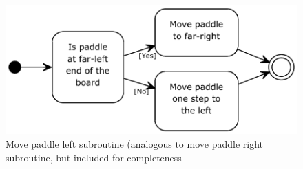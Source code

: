 \begin{figure}
\includegraphics[width = \textwidth]{description-and-methodology/program-flow/move-paddle-left.pdf}
\caption{Move paddle left subroutine (analogous to move paddle right subroutine, but included for completeness}
\label{fig:hist}
\end{figure}

